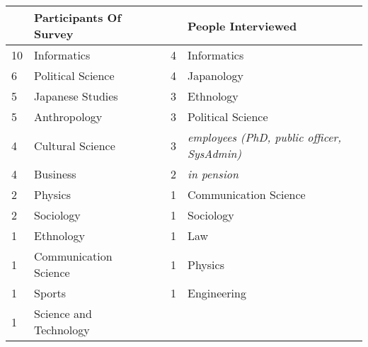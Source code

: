 \begin{tabular}{lllll}
\toprule
   & \textbf{Participants Of Survey} &  &   & \textbf{People Interviewed}                        \\
   \midrule
10 & Informatics                            &  & 4 & Informatics                                        \\
6  & Political Science                      &  & 4 & Japanology                                         \\
5  & Japanese Studies                       &  & 3 & Ethnology                                          \\
5  & Anthropology                           &  & 3 & Political Science                                  \\
4  & Cultural Science                       &  & 3 & \textit{employees (PhD, public officer, SysAdmin)} \\
4  & Business                               &  & 2 & \textit{in pension}                                \\
2  & Physics                                &  & 1 & Communication Science                              \\
2  & Sociology                              &  & 1 & Sociology                                          \\
1  & Ethnology                              &  & 1 & Law                                                \\
1  & Communication Science                  &  & 1 & Physics                                            \\
1  & Sports                                 &  & 1 & Engineering                                        \\
1  & Science and Technology                 &  &   &               \\
\bottomrule
\end{tabular}